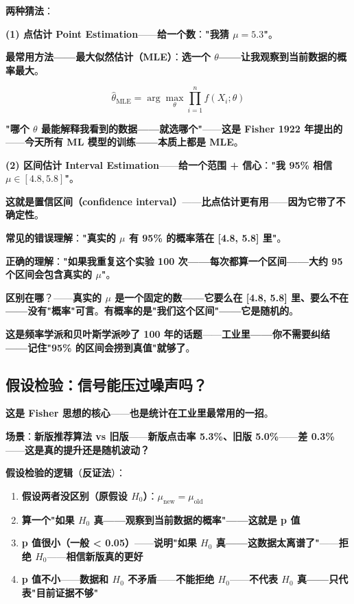 \textbf{两种猜法}：

\textbf{(1) 点估计 Point Estimation}——\textbf{给一个数}：\textbf{"我猜 $\mu = 5.3$"}。

\textbf{最常用方法——最大似然估计（MLE）}：\textbf{选一个 $\theta$——让我观察到当前数据的概率最大}。

\begin{equation}
\hat{\theta}_{\text{MLE}} = \arg\max_\theta \prod_{i=1}^n f(X_i; \theta)
\end{equation}

\textbf{"哪个 $\theta$ 最能解释我看到的数据——就选哪个"}——\textbf{这是 Fisher 1922 年提出的}——\textbf{今天所有 ML 模型的训练——本质上都是 MLE}。

\textbf{(2) 区间估计 Interval Estimation}——\textbf{给一个范围 + 信心}：\textbf{"我 95\% 相信 $\mu \in [4.8, 5.8]$"}。

\textbf{这就是置信区间（confidence interval）}——\textbf{比点估计更有用}——\textbf{因为它带了不确定性}。

\begin{tcolorbox}[colback=yellow!10, colframe=orange!70!black, title={\textbf{警告：95\% 置信区间不是你以为的那个意思}}]
\textbf{常见的错误理解}：\textbf{"真实的 $\mu$ 有 95\% 的概率落在 [4.8, 5.8] 里"}。

\textbf{正确的理解}：\textbf{"如果我重复这个实验 100 次——每次都算一个区间——大约 95 个区间会包含真实的 $\mu$"}。

\textbf{区别在哪}？——\textbf{真实的 $\mu$ 是一个固定的数——它要么在 [4.8, 5.8] 里、要么不在——没有"概率"可言}。\textbf{有概率的是"我们这个区间"——它是随机的}。

\textbf{这是频率学派和贝叶斯学派吵了 100 年的话题}——\textbf{工业里——你不需要纠结——记住"95\% 的区间会捞到真值"就够了}。
\end{tcolorbox}

\subsection{假设检验：信号能压过噪声吗？}

\textbf{这是 Fisher 思想的核心}——\textbf{也是统计在工业里最常用的一招}。

\textbf{场景}：\textbf{新版推荐算法 vs 旧版}——\textbf{新版点击率 5.3\%、旧版 5.0\%}——\textbf{差 0.3\%}——\textbf{这是真的提升还是随机波动？}

\textbf{假设检验的逻辑}（\textbf{反证法}）：

\begin{enumerate}
\item \textbf{假设两者没区别（原假设 $H_0$）}：\textbf{$\mu_{\text{new}} = \mu_{\text{old}}$}
\item \textbf{算一个"如果 $H_0$ 真——观察到当前数据的概率"——这就是 p 值}
\item \textbf{p 值很小（一般 < 0.05）}——\textbf{说明"如果 $H_0$ 真——这数据太离谱了"}——\textbf{拒绝 $H_0$}——\textbf{相信新版真的更好}
\item \textbf{p 值不小}——\textbf{数据和 $H_0$ 不矛盾}——\textbf{不能拒绝 $H_0$}——\textbf{不代表 $H_0$ 真——只代表"目前证据不够"}
\end{enumerate}

